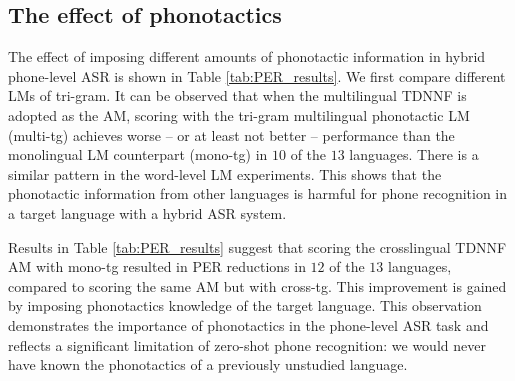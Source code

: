 \documentclass{article}
\begin{document}
 \subsection{The effect of phonotactics}
The effect of imposing different amounts of phonotactic information in hybrid phone-level ASR  is shown in Table \ref{tab:PER_results}. 
We first compare different LMs of tri-gram.
It can be observed that when the multilingual TDNNF is adopted as the AM, scoring with the tri-gram multilingual phonotactic LM (multi-tg) achieves worse -- or at least not better -- performance than the monolingual LM counterpart (mono-tg) in $10$ of the $13$ languages. There is a similar pattern in the word-level LM experiments.
This shows that the phonotactic information from other languages is harmful for phone recognition in a target language with a hybrid ASR system. 

Results in Table \ref{tab:PER_results} suggest that scoring the crosslingual TDNNF AM with mono-tg resulted in PER reductions in $12$ of  the $13$ languages, compared to scoring the same AM but with cross-tg. 
This improvement is gained by imposing phonotactics knowledge of the target language.
This observation demonstrates the importance of phonotactics in the phone-level ASR task and reflects a significant limitation of zero-shot phone recognition: we would never have known the phonotactics of a previously unstudied language. 
\end{document}
